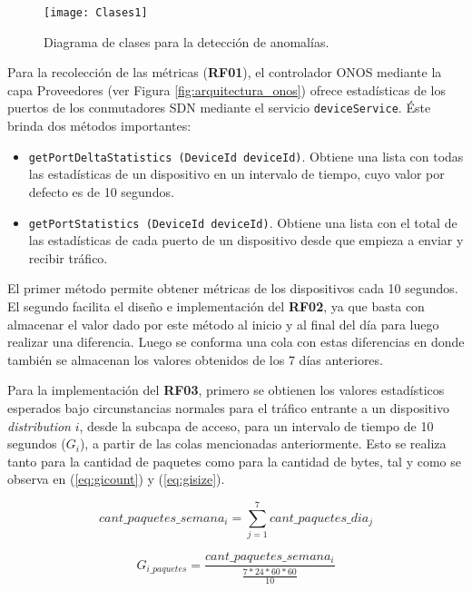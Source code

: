 \begin{figure}[H]
	\centering 
	\texttt{[image: Clases1]}
	\caption{Diagrama de clases para la detección de anomalías.}
	\label{fig:diagrama_clases_1}
\end{figure}

Para la recolección de las métricas (\textbf{RF01}), el controlador ONOS
mediante la capa Proveedores (ver Figura \ref{fig:arquitectura_onos}) ofrece
estadísticas de los puertos de los conmutadores SDN mediante el servicio
\verb|deviceService|. Éste brinda dos métodos importantes:

\begin{itemize}
\item \verb|getPortDeltaStatistics (DeviceId deviceId)|. Obtiene una lista con
  todas las estadísticas de un dispositivo en un intervalo de tiempo, cuyo valor
  por defecto es de 10 segundos.
\item \verb|getPortStatistics (DeviceId deviceId)|. Obtiene una lista con el
  total de las estadísticas de cada puerto de un dispositivo desde que empieza a
  enviar y recibir tráfico.
\end{itemize}

El primer método permite obtener métricas de los dispositivos cada 10 segundos.
El segundo facilita el diseño e implementación del \textbf{RF02}, ya que basta
con almacenar el valor dado por este método al inicio y al final del día para
luego realizar una diferencia. Luego se conforma una cola con estas diferencias
en donde también se almacenan los valores obtenidos de los 7 días anteriores.

Para la implementación del \textbf{RF03}, primero se obtienen los valores
estadísticos esperados bajo circunstancias normales para el tráfico entrante a
un dispositivo \textit{distribution} \(i\), desde la subcapa de acceso, para un
intervalo de tiempo de 10 segundos (\textbf{\(G_i\)}), a partir de las colas
mencionadas anteriormente. Esto se realiza tanto para la cantidad de paquetes
como para la cantidad de bytes, tal y como se observa en (\ref{eq:gicount}) y
(\ref{eq:gisize}).

\begin{equation}
	cant\_paquetes\_semana_i={\sum_{j=1}^7 cant\_paquetes\_dia_{j}}
\end{equation}

\begin{equation}\label{eq:gicount}
    G_{i\_paquetes}={\frac{cant\_paquetes\_semana_i}{\frac{7*24*60*60}{10}}}
\end{equation}

